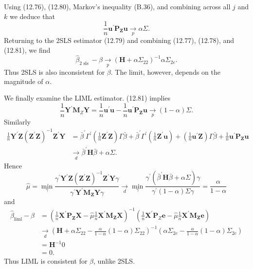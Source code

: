 \documentclass[10pt]{article}
\begin{document}
Using (12.76), (12.80), Markov's inequality (B.36), and combining across all $j$ and $k$ we deduce that
$$
\frac{1}{n} \boldsymbol{u}^{\prime} \boldsymbol{P}_{\boldsymbol{Z}} \boldsymbol{u} \underset{p}{\longrightarrow} \alpha \Sigma .
$$
Returning to the 2SLS estimator (12.79) and combining (12.77), (12.78), and (12.81), we find
$$
\widehat{\beta}_{2 \text { sls }}-\beta \underset{p}{\longrightarrow}\left(\boldsymbol{H}+\alpha \Sigma_{22}\right)^{-1} \alpha \Sigma_{2 e} .
$$
Thus 2SLS is also inconsistent for $\beta$. The limit, however, depends on the magnitude of $\alpha$.

We finally examine the LIML estimator. (12.81) implies
$$
\frac{1}{n} \boldsymbol{Y}^{\prime} \boldsymbol{M}_{Z} \boldsymbol{Y}=\frac{1}{n} \boldsymbol{u}^{\prime} \boldsymbol{u}-\frac{1}{n} \boldsymbol{u}^{\prime} \boldsymbol{P}_{\boldsymbol{Z}} \boldsymbol{u} \underset{p}{\longrightarrow}(1-\alpha) \Sigma .
$$
Similarly
$$
\begin{aligned}
\frac{1}{n} \boldsymbol{Y}^{\prime} \boldsymbol{Z}\left(\boldsymbol{Z}^{\prime} \boldsymbol{Z}\right)^{-1} \boldsymbol{Z}^{\prime} \boldsymbol{Y} &=\bar{\beta}^{\prime} \Gamma^{\prime}\left(\frac{1}{n} \boldsymbol{Z}^{\prime} \boldsymbol{Z}\right) \Gamma \bar{\beta}+\bar{\beta}^{\prime} \Gamma^{\prime}\left(\frac{1}{n} \boldsymbol{Z}^{\prime} \boldsymbol{u}\right)+\left(\frac{1}{n} \boldsymbol{u}^{\prime} \boldsymbol{Z}\right) \Gamma \bar{\beta}+\frac{1}{n} \boldsymbol{u}^{\prime} \boldsymbol{P}_{\boldsymbol{Z}} \boldsymbol{u} \\
& \underset{d}{\longrightarrow} \bar{\beta}^{\prime} \boldsymbol{H} \bar{\beta}+\alpha \Sigma .
\end{aligned}
$$
Hence
$$
\widehat{\mu}=\min _{\gamma} \frac{\gamma^{\prime} \boldsymbol{Y}^{\prime} \boldsymbol{Z}\left(\boldsymbol{Z}^{\prime} \boldsymbol{Z}\right)^{-1} \boldsymbol{Z}^{\prime} \boldsymbol{Y} \gamma}{\gamma^{\prime} \boldsymbol{Y}^{\prime} \boldsymbol{M}_{\boldsymbol{Z}} \boldsymbol{Y} \gamma} \underset{d}{\longrightarrow} \min _{\gamma} \frac{\gamma^{\prime}\left(\bar{\beta}^{\prime} \boldsymbol{H} \bar{\beta}+\alpha \Sigma\right) \gamma}{\gamma^{\prime}(1-\alpha) \Sigma \gamma}=\frac{\alpha}{1-\alpha}
$$
and
$$
\begin{aligned}
\widehat{\beta}_{\mathrm{liml}}-\beta &=\left(\frac{1}{n} \boldsymbol{X}^{\prime} \boldsymbol{P}_{\boldsymbol{Z}} \boldsymbol{X}-\widehat{\mu} \frac{1}{n} \boldsymbol{X}^{\prime} \boldsymbol{M}_{\boldsymbol{Z}} \boldsymbol{X}\right)^{-1}\left(\frac{1}{n} \boldsymbol{X}^{\prime} \boldsymbol{P}_{Z} \boldsymbol{e}-\widehat{\mu} \frac{1}{n} \boldsymbol{X}^{\prime} \boldsymbol{M}_{\boldsymbol{Z}} \boldsymbol{e}\right) \\
& \underset{d}{\longrightarrow}\left(\boldsymbol{H}+\alpha \Sigma_{22}-\frac{\alpha}{1-\alpha}(1-\alpha) \Sigma_{22}\right)^{-1}\left(\alpha \Sigma_{2 e}-\frac{\alpha}{1-\alpha}(1-\alpha) \Sigma_{2 e}\right) \\
&=\boldsymbol{H}^{-1} 0 \\
&=0 .
\end{aligned}
$$
Thus LIML is consistent for $\beta$, unlike 2SLS.
\end{document}
